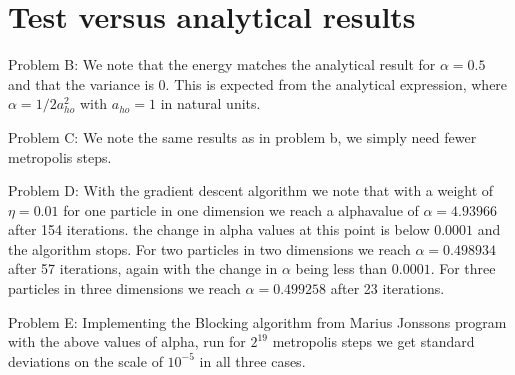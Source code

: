 \documentclass[a4paper, 10pt, english]{revtex4-2} %
\begin{document}
    
\section*{\large Test versus analytical results}
    Problem B: We note that the energy matches the analytical result for $\alpha = 0.5$ and that the variance is 0.
    This is expected from the analytical expression, where $\alpha = 1/2a_{ho}^2$ with $a_{ho} = 1$ in natural units.
    
    Problem C: We note the same results as in problem b, we simply need fewer metropolis steps.

    Problem D: With the gradient descent algorithm we note that with a weight of $\eta = 0.01$ for one particle in one dimension we reach a alphavalue of $\alpha = 4.93966$ after 154 iterations. the change in alpha values at this point is below $0.0001$ and the algorithm stops.
    For two particles in two dimensions we reach $\alpha = 0.498934$ after 57 iterations, again with the change in $\alpha$ being less than $0.0001$.
    For three particles in three dimensions we reach $\alpha = 0.499258$ after 23 iterations.

    Problem E: Implementing the Blocking algorithm from Marius Jonssons program with the above values of alpha, run for $2^{19}$ metropolis steps we get standard deviations on the scale of $10^{-5}$ in all three cases.
\end{document}
